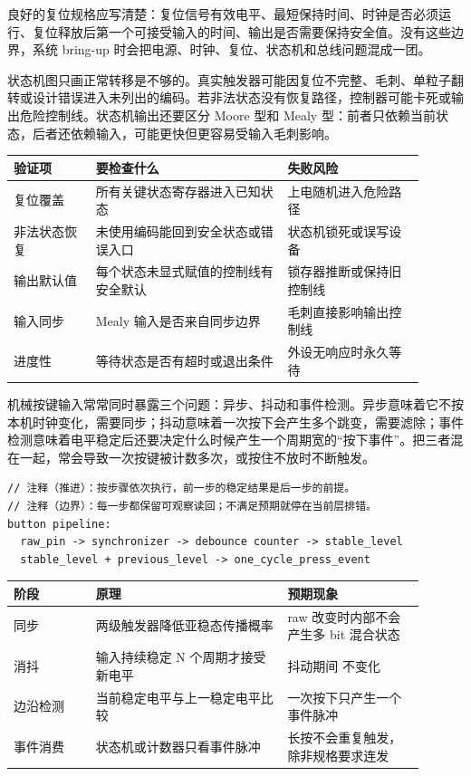 良好的复位规格应写清楚：复位信号有效电平、最短保持时间、时钟是否必须运行、复位释放后第一个可接受输入的时间、输出是否需要保持安全值。没有这些边界，系统 bring-up 时会把电源、时钟、复位、状态机和总线问题混成一团。

状态机图只画正常转移是不够的。真实触发器可能因复位不完整、毛刺、单粒子翻转或设计错误进入未列出的编码。若非法状态没有恢复路径，控制器可能卡死或输出危险控制线。状态机输出还要区分 Moore 型和 Mealy 型：前者只依赖当前状态，后者还依赖输入，可能更快但更容易受输入毛刺影响。

\begin{longtable}{L{0.18\linewidth}L{0.42\linewidth}L{0.3\linewidth}}
\toprule
验证项 & 要检查什么 & 失败风险 \\
\midrule
复位覆盖 & 所有关键状态寄存器进入已知状态 & 上电随机进入危险路径 \\\tablerowrule
非法状态恢复 & 未使用编码能回到安全状态或错误入口 & 状态机锁死或误写设备 \\\tablerowrule
输出默认值 & 每个状态未显式赋值的控制线有安全默认 & 锁存器推断或保持旧控制线 \\\tablerowrule
输入同步 & Mealy 输入是否来自同步边界 & 毛刺直接影响输出控制线 \\\tablerowrule
进度性 & 等待状态是否有超时或退出条件 & 外设无响应时永久等待 \\
\bottomrule
\end{longtable}

机械按键输入常常同时暴露三个问题：异步、抖动和事件检测。异步意味着它不按本机时钟变化，需要同步；抖动意味着一次按下会产生多个跳变，需要滤除；事件检测意味着电平稳定后还要决定什么时候产生一个周期宽的“按下事件”。把三者混在一起，常会导致一次按键被计数多次，或按住不放时不断触发。

\begin{lstlisting}
// 注释（推进）：按步骤依次执行，前一步的稳定结果是后一步的前提。
// 注释（边界）：每一步都保留可观察读回；不满足预期就停在当前层排错。
button pipeline:
  raw_pin -> synchronizer -> debounce counter -> stable_level
  stable_level + previous_level -> one_cycle_press_event
\end{lstlisting}

\begin{longtable}{L{0.18\linewidth}L{0.42\linewidth}L{0.3\linewidth}}
\toprule
阶段 & 原理 & 预期现象 \\
\midrule
同步 & 两级触发器降低亚稳态传播概率 & raw 改变时内部不会产生多 bit 混合状态 \\\tablerowrule
消抖 & 输入持续稳定 N 个周期才接受新电平 & 抖动期间  不变化 \\\tablerowrule
边沿检测 & 当前稳定电平与上一稳定电平比较 & 一次按下只产生一个事件脉冲 \\\tablerowrule
事件消费 & 状态机或计数器只看事件脉冲 & 长按不会重复触发，除非规格要求连发 \\
\bottomrule
\end{longtable}



